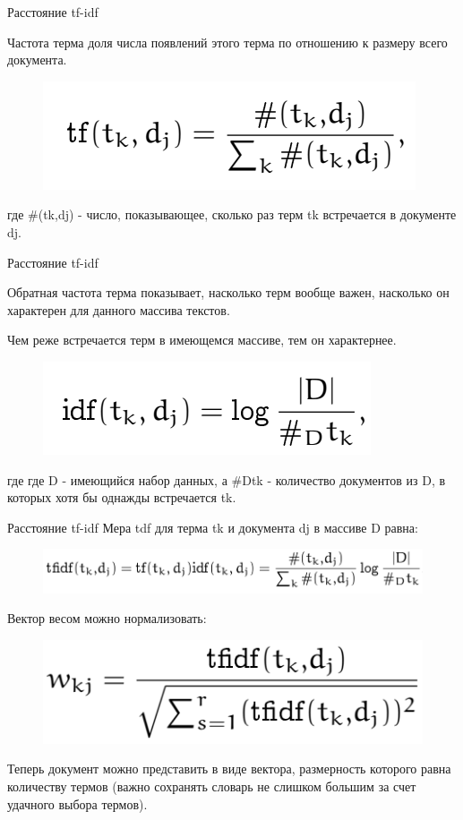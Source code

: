 \begin{frame}{Расстояние tf-idf}
\begin{block}{Частота терма}
доля числа появлений этого терма по отношению к размеру всего документа.
\end{block}
\begin{figure}[h]
\centering
\includegraphics[scale=0.4]{images/lec07-pic10.png}
\end{figure}
где \#(tk,dj) - число, показывающее, сколько раз терм tk встречается в документе dj.
\end{frame}

\begin{frame}{Расстояние tf-idf}
\begin{block}{Обратная частота терма}
показывает, насколько терм вообще важен, насколько он характерен для данного массива текстов.
\end{block}
Чем реже встречается терм в имеющемся массиве, тем он характернее.
\begin{figure}[h]
\centering
\includegraphics[scale=0.4]{images/lec07-pic11.png}
\end{figure}
где где D - имеющийся набор данных, а \#Dtk - количество документов из D, в которых хотя бы однажды встречается tk.
\end{frame}

\begin{frame}{Расстояние tf-idf}
Мера tdf для терма tk и документа dj в массиве D равна:
\begin{figure}[h]
\centering
\includegraphics[scale=0.4]{images/lec07-pic12.png}
\end{figure}
Вектор весом можно нормализовать:
\begin{figure}[h]
\centering
\includegraphics[scale=0.4]{images/lec07-pic13.png}
\end{figure}
Теперь документ можно представить в виде вектора, размерность которого равна количеству термов (важно сохранять словарь не слишком большим за счет удачного выбора термов).
\end{frame}

